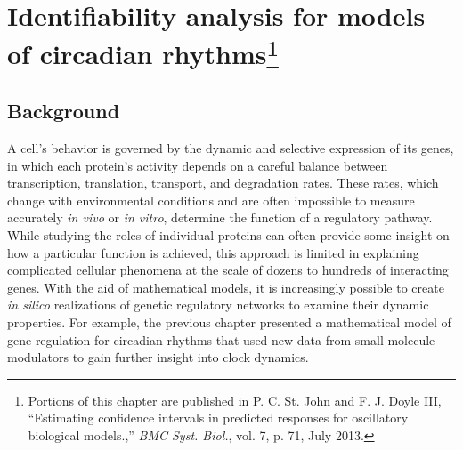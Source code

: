 
\chapter[Identifiability analysis for models of circadian rhythms]{ Identifiability analysis for models of circadian rhythms\footnote{ Portions of this chapter are published in P. C. St. John and F. J. Doyle III, ``Estimating confidence intervals in predicted responses for oscillatory biological models.,'' {\itshape BMC Syst. Biol.}, vol. 7, p. 71, July 2013.}}\label{chap:id}

\section{Background}

A cell's behavior is governed by the dynamic and selective expression of its genes, in which each protein's activity depends on a careful balance between transcription, translation, transport, and degradation rates. 
These rates, which change with environmental conditions and are often impossible to measure accurately {\itshape in vivo} or {\itshape in vitro}, determine the function of a regulatory pathway. 
While studying the roles of individual proteins can often provide some insight on how a particular function is achieved, this approach is limited in explaining complicated cellular phenomena at the scale of dozens to hundreds of interacting genes. 
With the aid of mathematical models, it is increasingly possible to create {\itshape in silico} realizations of genetic regulatory networks to examine their dynamic properties.
For example, the previous chapter presented a mathematical model of gene regulation for circadian rhythms that used new data from small molecule modulators to gain further insight into clock dynamics.

